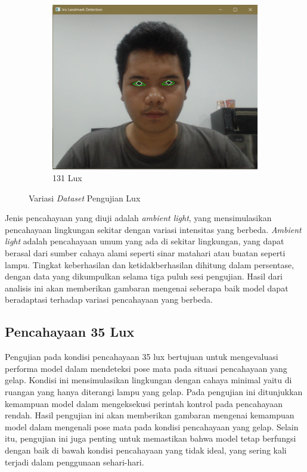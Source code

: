 \begin{figure}[H]
  \begin{subfigure}[b]{0.4\linewidth}
      \centering %
      \includegraphics[width=\linewidth]{gambar/bab4/131.png}
      \caption{131 Lux}
      \label{fig:imagec}
  \end{subfigure}
  \caption{Variasi \emph{Dataset} Pengujian Lux}
  \label{fig:Variasi Lux}
\end{figure}

Jenis pencahayaan yang diuji adalah \emph{ambient light}, yang mensimulasikan pencahayaan lingkungan sekitar dengan variasi intensitas yang berbeda. \emph{Ambient light} adalah pencahayaan umum yang ada di sekitar lingkungan, yang dapat berasal dari sumber cahaya alami seperti sinar matahari atau buatan seperti lampu. Tingkat keberhasilan dan ketidakberhasilan dihitung dalam persentase, dengan data yang dikumpulkan selama tiga puluh sesi pengujian. Hasil dari analisis ini akan memberikan gambaran mengenai seberapa baik model dapat beradaptasi terhadap variasi pencahayaan yang berbeda.

\subsection{Pencahayaan 35 Lux}

Pengujian pada kondisi pencahayaan 35 lux bertujuan untuk mengevaluasi performa model dalam mendeteksi pose mata pada situasi pencahayaan yang gelap. Kondisi ini mensimulasikan lingkungan dengan cahaya minimal yaitu di ruangan yang hanya diterangi lampu yang gelap. Pada pengujian ini ditunjukkan kemampuan model dalam mengeksekusi perintah kontrol pada pencahayaan rendah. Hasil pengujian ini akan memberikan gambaran mengenai kemampuan model dalam mengenali pose mata pada kondisi pencahayaan yang gelap. Selain itu, pengujian ini juga penting untuk memastikan bahwa model tetap berfungsi dengan baik di bawah kondisi pencahayaan yang tidak ideal, yang sering kali terjadi dalam penggunaan sehari-hari.

